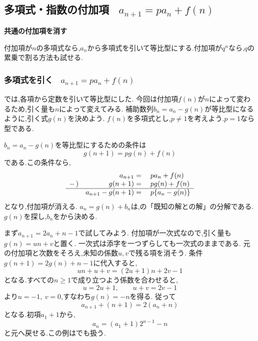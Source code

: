 
\subsection{\texorpdfstring{多項式・指数の付加項 \, $\displaystyle a_{n+1}=pa_n+f(n)$}{多項式・指数の付加項}}\label{節：階差等比複合型}
  \begin{bookpoint}
    \textbf{共通の付加項を消す}\par
    付加項が$n$の多項式なら,$a_n$から多項式を引いて等比型にする.付加項が$q^n$なら,$q$の累乗で割る方法も試せる.
  \end{bookpoint}
  \subsubsection{\texorpdfstring{多項式を引く \, $\displaystyle a_{n+1}=pa_n+f(n)$}{多項式を引く}}
    では,各項から定数を引いて等比型にした.
    今回は付加項$f(n)$が$n$によって変わるため,引く量も$n$によって変えてみる.
    補助数列$b_n=a_n-g(n)$が等比型になるように,引く式$g(n)$を決めよう.
    $f(n)$を多項式とし,$p\ne1$を考えよう.$p=1$なら型である.

    $b_n=a_n-g(n)$を等比型にするための条件は
    \[
      g(n+1)=pg(n)+f(n)
    \]
    である.この条件なら,
    \[
      \begin{array}{rrl}
        &a_{n+1}={}&pa_n+f(n)\\
        -\,)&g(n+1)={}&pg(n)+f(n)\\ \hline
        &a_{n+1}-g(n+1)={}&p\{a_n-g(n)\}
      \end{array}
    \]
    となり,付加項が消える.
    $a_n=g(n)+b_n$は,の「既知の解との解」の分解である.
    $g(n)$を探し,$b_n$をから決める.

    まず$a_{n+1}=2a_n+n-1$で試してみよう.
    付加項が一次式なので,引く量も$g(n)=un+v$と置く.
    一次式は添字を一つずらしても一次式のままである.
    元の付加項と次数をそろえ,未知の係数$u,v$で残る項を消そう.
    条件$g(n+1)=2g(n)+n-1$に代入すると,
    \[
      un+u+v=(2u+1)n+2v-1
    \]
    となる.すべての$n\ge1$で成り立つよう係数を合わせると,
    \[
      u=2u+1,\qquad u+v=2v-1
    \]
    より$u=-1,\ v=0$,すなわち$g(n)=-n$を得る.
    従って
    \[
      a_{n+1}+(n+1)=2(a_n+n)
    \]
    となる.初項$a_1+1$から,
    \[
      a_n=(a_1+1)2^{n-1}-n
    \]
    と元へ戻せる.この例はでも扱う.

